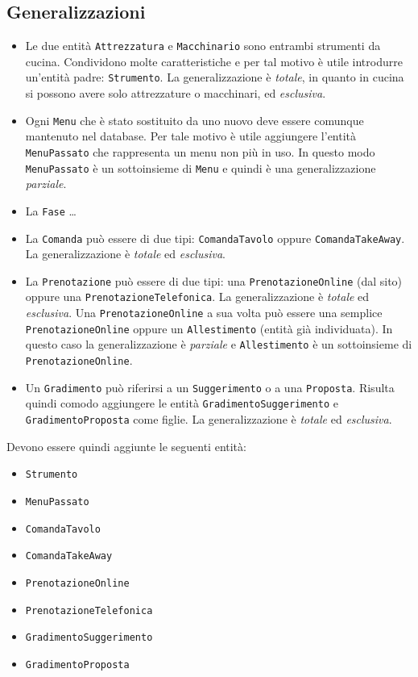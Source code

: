 \subsection{Generalizzazioni}
\begin{itemize}
\item Le due entità {\tt Attrezzatura} e {\tt Macchinario} sono entrambi
    strumenti da cucina. Condividono molte caratteristiche e per tal motivo è
    utile introdurre un'entità padre: {\tt Strumento}. La generalizzazione è
    {\it totale}, in quanto in cucina si possono avere solo attrezzature o
    macchinari, ed {\it esclusiva}.
\item Ogni {\tt Menu} che è stato sostituito da uno nuovo deve essere comunque
    mantenuto nel database. Per tale motivo è utile aggiungere l'entità
    {\tt MenuPassato} che rappresenta un menu non più in uso. In questo modo
    {\tt MenuPassato} è un sottoinsieme di {\tt Menu} e quindi è una generalizzazione
    {\it parziale}.
\item La {\tt Fase} \ldots                                                             %
\item La {\tt Comanda} può essere di due tipi: {\tt ComandaTavolo} oppure
    {\tt ComandaTakeAway}. La generalizzazione è {\it totale} ed
    {\it esclusiva}.
\item La {\tt Prenotazione} può essere di due tipi: una {\tt PrenotazioneOnline} (dal sito)
    oppure una {\tt PrenotazioneTelefonica}. La generalizzazione è {\it totale}
    ed {\it esclusiva}. Una {\tt PrenotazioneOnline} a sua volta può essere
    una semplice {\tt PrenotazioneOnline} oppure un {\tt Allestimento} (entità già individuata).
    In questo caso la generalizzazione è {\it parziale} e {\tt Allestimento}
    è un sottoinsieme di {\tt PrenotazioneOnline}.
\item Un {\tt Gradimento} può riferirsi a un {\tt Suggerimento} o a una {\tt Proposta}.
    Risulta quindi comodo aggiungere le entità {\tt GradimentoSuggerimento} e
    {\tt GradimentoProposta} come figlie. La generalizzazione è {\it totale} ed
    {\it esclusiva}.
\end{itemize}

Devono essere quindi aggiunte le seguenti entità:
\begin{multicols}{2}
\begin{itemize}
    \item\tt Strumento
    \item\tt MenuPassato                                                               %
    \item\tt ComandaTavolo
    \item\tt ComandaTakeAway
    \item\tt PrenotazioneOnline
    \item\tt PrenotazioneTelefonica
    \item\tt GradimentoSuggerimento
    \item\tt GradimentoProposta
\end{itemize}
\end{multicols}
